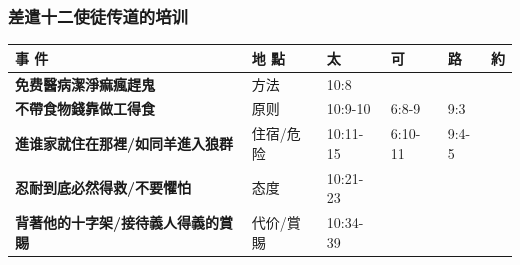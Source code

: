 \subsubsection{差遣十二使徒传道的培训}
\begin{table}[H]
\centering 
\begin{tabular}{p{17.07em}|p{8.43em}|p{5.285em}|p{5em}|p{4.285em}|p{1.855em}}\toprule
\textbf{事 件} & \textbf{地 點} & \textbf{太} & \textbf{可} & \textbf{路} & \textbf{約} \\\midrule


\textbf{免费醫病潔淨痲瘋趕鬼} &方法& 10:8& & & \multicolumn{1}{r}{} \\ \midrule
\textbf{不帶食物錢靠做工得食} & 原则& 10:9-10& 6:8-9& 9:3 & \multicolumn{1}{r}{} \\ \midrule
\textbf{進谁家就住在那裡/如同羊進入狼群} &住宿/危险 & 10:11-15& 6:10-11& 9:4-5 & \multicolumn{1}{r}{} \\ \midrule

\textbf{忍耐到底必然得救/不要懼怕} &态度& 10:21-23&& & \multicolumn{1}{r}{} \\ \midrule

\textbf{背著他的十字架/接待義人得義的賞賜} &代价/賞賜&10:34-39&  && \multicolumn{1}{r}{} \\ \midrule
\end{tabular}%
\end{table}%

